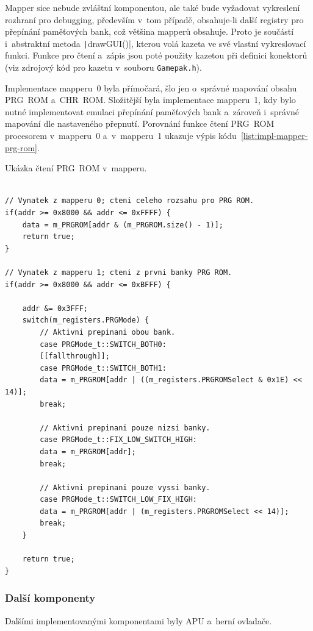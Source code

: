 Mapper sice nebude zvláštní komponentou, ale také bude vyžadovat vykreslení rozhraní pro debugging, především v~tom případě, obsahuje-li další registry pro přepínání paměťových bank, což většina mapperů obsahuje. Proto je součástí i~abstraktní metoda \texttt|drawGUI()|, kterou volá kazeta ve své vlastní vykreslovací funkci. Funkce pro čtení a~zápis jsou poté použity kazetou při definici konektorů (viz zdrojový kód pro kazetu v~souboru \texttt{Gamepak.h}).

Implementace mapperu~0 byla přímočará, šlo jen o~správné mapování obsahu PRG~ROM a~CHR~ROM. Složitější byla implementace mapperu~1, kdy bylo nutné implementovat emulaci přepínání paměťových bank a~zároveň i~správné mapování dle nastaveného přepnutí. Porovnání funkce čtení PRG~ROM procesorem v~mapperu~0 a~v~mapperu~1 ukazuje výpis kódu~\ref{list:impl-mapper-prg-rom}.

\begin{listing}
	\caption{Ukázka čtení PRG~ROM v~mapperu.}
	\label{list:impl-mapper-prg-rom}
	\begin{verbatim}

// Vynatek z mapperu 0; cteni celeho rozsahu pro PRG ROM.
if(addr >= 0x8000 && addr <= 0xFFFF) {
	data = m_PRGROM[addr & (m_PRGROM.size() - 1)];
	return true;
}

// Vynatek z mapperu 1; cteni z prvni banky PRG ROM.
if(addr >= 0x8000 && addr <= 0xBFFF) {
	
	addr &= 0x3FFF;	
	switch(m_registers.PRGMode) {
		// Aktivni prepinani obou bank.
		case PRGMode_t::SWITCH_BOTH0:
		[[fallthrough]];
		case PRGMode_t::SWITCH_BOTH1:
		data = m_PRGROM[addr | ((m_registers.PRGROMSelect & 0x1E) << 14)];
		break;
		
		// Aktivni prepinani pouze nizsi banky.
		case PRGMode_t::FIX_LOW_SWITCH_HIGH:
		data = m_PRGROM[addr];
		break;
		
		// Aktivni prepinani pouze vyssi banky.
		case PRGMode_t::SWITCH_LOW_FIX_HIGH:
		data = m_PRGROM[addr | (m_registers.PRGROMSelect << 14)];
		break;
	}
	
	return true;
}
	\end{verbatim}
\end{listing}

\subsubsection{Další komponenty}
\label{sec:impl-dalsi}
Dalšími implementovanými komponentami byly APU a~herní ovladače.

